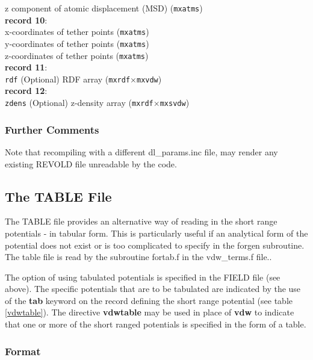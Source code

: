 \begin{tabbing}
\> z component of atomic displacement (MSD) ({\tt mxatms})\\
{\bf record 10}:\\
\> x-coordinates of tether points ({\tt mxatms})\\
\> y-coordinates of tether points ({\tt mxatms})\\
\> z-coordinates of tether points ({\tt mxatms})\\
{\bf record 11}:\\
\> {\tt rdf} \> (Optional) RDF array ({\tt mxrdf}$\times${\tt mxvdw})\\
{\bf record 12}:\\
\> {\tt zdens} \> (Optional) z-density array ({\tt mxrdf}$\times${\tt mxsvdw})\\
\end{tabbing}

\subsubsection{Further Comments}

Note that recompiling \D{} with a different {\sc dl\_params.inc} file,
may render any existing REVOLD file unreadable by the code.

\subsection{The TABLE File}
\label{tablefile}

The TABLE file provides an alternative way of reading in the short
range potentials - in tabular form. This is particularly useful if an
analytical form of the potential does not exist or is too complicated
to specify in the {\sc forgen} subroutine. The table file is read by
the subroutine {\sc fortab.f} in the {\sc vdw\_terms.f} file..

The option of using tabulated potentials is specified in the FIELD
file (see above). The specific potentials that are to be tabulated are
indicated by the use of the {\bf tab} keyword on the record defining
the short range potential (see table \ref{vdwtable}).  The directive
{\bf vdwtable} may be used in place of {\bf vdw} to indicate that one
or more of the short ranged potentials is specified in the form of a
table.

\subsubsection{Format}

